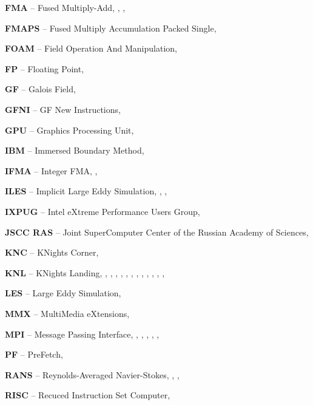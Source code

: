 \textbf{FMA} -- Fused Multiply-Add, \pageref{abbr:fma-1}, \pageref{abbr:fma-2}, \pageref{abbr:fma-3}

\textbf{FMAPS} -- Fused Multiply Accumulation Packed Single, \pageref{abbr:fmaps-1}

\textbf{FOAM} -- Field Operation And Manipulation, \pageref{abbr:foam-1}

\textbf{FP} -- Floating Point, \pageref{abbr:fp-1}

\textbf{GF} -- Galois Field, \pageref{abbr:gf-1}

\textbf{GFNI} -- GF New Instructions, \pageref{abbr:gfni-1}

\textbf{GPU} -- Graphics Processing Unit, \pageref{abbr:gpu-1}

\textbf{IBM} -- Immersed Boundary Method, \pageref{abbr:ibm-1}

\textbf{IFMA} -- Integer FMA, \pageref{abbr:ifma-1}, \pageref{abbr:ifma-2}

\textbf{ILES} -- Implicit Large Eddy Simulation, \pageref{abbr:iles-1}, \pageref{abbr:iles-2}, \pageref{abbr:iles-3}

\textbf{IXPUG} -- Intel eXtreme Performance Users Group, \pageref{abbr:ixpug-1}

\textbf{JSCC RAS} -- Joint SuperComputer Center of the Russian Academy of Sciences, \pageref{abbr:jscc-ras-1}

\textbf{KNC} -- KNights Corner, \pageref{abbr:knc-1}

\textbf{KNL} -- KNights Landing, \pageref{abbr:knl-1}, \pageref{abbr:knl-2}, \pageref{abbr:knl-3}, \pageref{abbr:knl-4}, \pageref{abbr:knl-5}, \pageref{abbr:knl-6}, \pageref{abbr:knl-7}, \pageref{abbr:knl-8}, \pageref{abbr:knl-9}, \pageref{abbr:knl-10}, \pageref{abbr:knl-10-2}, \pageref{abbr:knl-11}, \pageref{abbr:knl-12}

\textbf{LES} -- Large Eddy Simulation, \pageref{abbr:les-1}

\textbf{MMX} -- MultiMedia eXtensions, \pageref{abbr:mmx-1}

\textbf{MPI} -- Message Passing Interface, \pageref{abbr:mpi-1}, \pageref{abbr:mpi-2}, \pageref{abbr:mpi-3}, \pageref{abbr:mpi-4}, \pageref{abbr:mpi-5}, \pageref{abbr:mpi-6}

\textbf{PF} -- PreFetch, \pageref{abbr:pf-1}

\textbf{RANS} -- Reynolds-Averaged Navier-Stokes, \pageref{abbr:rans-1}, \pageref{abbr:rans-2}, \pageref{abbr:rans-3}

\textbf{RISC} -- Recuced Instruction Set Computer, \pageref{abbr:risc-1}

